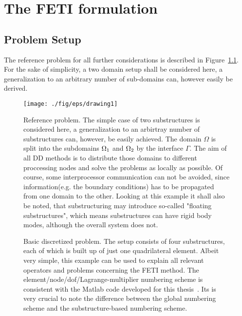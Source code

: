 \chapter{The FETI formulation}\label{cha:feti_formulation}
\section{Problem Setup}
The reference problem for all further considerations is described in Figure~\ref{fig:reference_problem}. For the sake of simplicity, a two domain setup shall be considered here, a generalization to an arbitrary number of sub-domains can, however easily be derived.


\begin{figure}[h]
  \centering
  \texttt{[image: ./fig/eps/drawing1]}
  \caption[Domain decomposition reference problem]{Reference problem. The simple case of two substructures is considered here, a generalization to an arbirtray number of substructures can, however, be easily achieved. The domain $\Omega$ is split into the subdomains $\Omega_1$ and $\Omega_2$ by the interface $\Gamma$. The aim of all DD methods is to distribute those domains to different proccessing nodes and solve the problems as locally as possible. Of course, some interprocessor communication can not be avoided, since information(e.g. the boundary conditions) has to be propagated from one domain to the other. Looking at this example it shall also be noted, that substructuring may introduce so-called "floating substructures", which means substructures can have rigid body modes, although the overall system does not.}\label{fig:reference_problem}
\end{figure}
\begin{figure}[h!]
  \begin{center}
    
    \caption[Simple discretized problem]{Basic discretized problem. The setup consists of four substructures, each of which is built up of just one quadrilateral element. Albeit very simple, this example can be used to explain all relevant operators and problems concerning the FETI method. The element/node/dof/Lagrange-multiplier numbering scheme is consistent with the Matlab code developed for this thesis~\cite{FEMAC}. Its is very crucial to note the difference between the global numbering scheme and the substructure-based numbering scheme. }
    \label{fig:simple_discretized_example}
  \end{center}
\end{figure}

